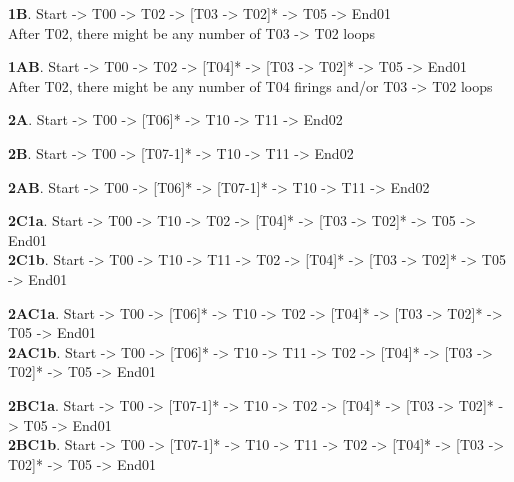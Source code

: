 \documentclass[]{article}
\begin{document}
\textbf{1B}. Start -\textgreater{} T00 -\textgreater{} T02
-\textgreater{} {[}T03 -\textgreater{} T02{]}* -\textgreater{} T05
-\textgreater{} End01\\ After T02, there might be any number of T03
-\textgreater{} T02 loops

\textbf{1AB}. Start -\textgreater{} T00 -\textgreater{} T02
-\textgreater{} {[}T04{]}* -\textgreater{} {[}T03 -\textgreater{}
T02{]}* -\textgreater{} T05 -\textgreater{} End01\\ After T02, there
might be any number of T04 firings and/or T03 -\textgreater{} T02 loops

\textbf{2A}. Start -\textgreater{} T00 -\textgreater{} {[}T06{]}*
-\textgreater{} T10 -\textgreater{} T11 -\textgreater{} End02

\textbf{2B}. Start -\textgreater{} T00 -\textgreater{} {[}T07-1{]}*
-\textgreater{} T10 -\textgreater{} T11 -\textgreater{} End02

\textbf{2AB}. Start -\textgreater{} T00 -\textgreater{} {[}T06{]}*
-\textgreater{} {[}T07-1{]}* -\textgreater{} T10 -\textgreater{} T11
-\textgreater{} End02

\textbf{2C1a}. Start -\textgreater{} T00 -\textgreater{} T10
-\textgreater{} T02 -\textgreater{} {[}T04{]}* -\textgreater{} {[}T03
-\textgreater{} T02{]}* -\textgreater{} T05 -\textgreater{}
End01\\\textbf{2C1b}. Start -\textgreater{} T00 -\textgreater{} T10
-\textgreater{} T11 -\textgreater{} T02 -\textgreater{} {[}T04{]}*
-\textgreater{} {[}T03 -\textgreater{} T02{]}* -\textgreater{} T05
-\textgreater{} End01

\textbf{2AC1a}. Start -\textgreater{} T00 -\textgreater{} {[}T06{]}*
-\textgreater{} T10 -\textgreater{} T02 -\textgreater{} {[}T04{]}*
-\textgreater{} {[}T03 -\textgreater{} T02{]}* -\textgreater{} T05
-\textgreater{} End01\\\textbf{2AC1b}. Start -\textgreater{} T00
-\textgreater{} {[}T06{]}* -\textgreater{} T10 -\textgreater{} T11
-\textgreater{} T02 -\textgreater{} {[}T04{]}* -\textgreater{} {[}T03
-\textgreater{} T02{]}* -\textgreater{} T05 -\textgreater{} End01

\textbf{2BC1a}. Start -\textgreater{} T00 -\textgreater{} {[}T07-1{]}*
-\textgreater{} T10 -\textgreater{} T02 -\textgreater{} {[}T04{]}*
-\textgreater{} {[}T03 -\textgreater{} T02{]}* -\textgreater{} T05
-\textgreater{} End01\\\textbf{2BC1b}. Start -\textgreater{} T00
-\textgreater{} {[}T07-1{]}* -\textgreater{} T10 -\textgreater{} T11
-\textgreater{} T02 -\textgreater{} {[}T04{]}* -\textgreater{} {[}T03
-\textgreater{} T02{]}* -\textgreater{} T05 -\textgreater{} End01
\end{document}

